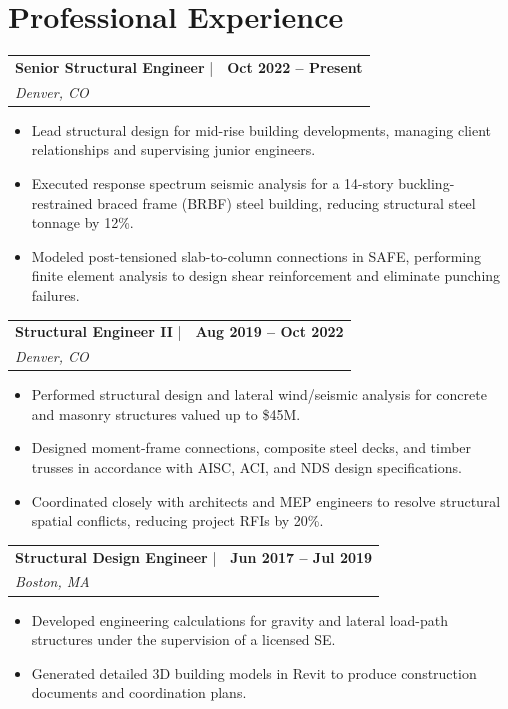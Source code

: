 \documentclass[10pt]{article}
\makeatletter
\newcommand{\resumeEntry}[4]{
    \noindent
    \begin{tabularx}{\textwidth}{@{} X r @{}}
        {\bfseries\color{textColor} #1} \quad | \quad {\bfseries\color{primaryColor} #2} & {\color{grayText}\small\bfseries #4} \\
        {\small\itshape\color{textColor} #3} & \\
    \end{tabularx}
    \vspace{-5pt}
}
\makeatother
\begin{document}
\vspace{3pt}

\section*{Professional Experience}

\resumeEntry{Senior Structural Engineer}{Meridian Structural Group}{Denver, CO}{Oct 2022 -- Present}
\begin{itemize}
    \item Lead structural design for mid-rise building developments, managing client relationships and supervising junior engineers.
    \item Executed response spectrum seismic analysis for a 14-story buckling-restrained braced frame (BRBF) steel building, reducing structural steel tonnage by 12\%.
    \item Modeled post-tensioned slab-to-column connections in SAFE, performing finite element analysis to design shear reinforcement and eliminate punching failures.
\end{itemize}

\vspace{4pt}

\resumeEntry{Structural Engineer II}{Vertex Engineering Consultants}{Denver, CO}{Aug 2019 -- Oct 2022}
\begin{itemize}
    \item Performed structural design and lateral wind/seismic analysis for concrete and masonry structures valued up to \$45M.
    \item Designed moment-frame connections, composite steel decks, and timber trusses in accordance with AISC, ACI, and NDS design specifications.
    \item Coordinated closely with architects and MEP engineers to resolve structural spatial conflicts, reducing project RFIs by 20\%.
\end{itemize}

\vspace{4pt}

\resumeEntry{Structural Design Engineer}{Synapse Design Lab}{Boston, MA}{Jun 2017 -- Jul 2019}
\begin{itemize}
    \item Developed engineering calculations for gravity and lateral load-path structures under the supervision of a licensed SE.
    \item Generated detailed 3D building models in Revit to produce construction documents and coordination plans.
\end{itemize}
\end{document}
